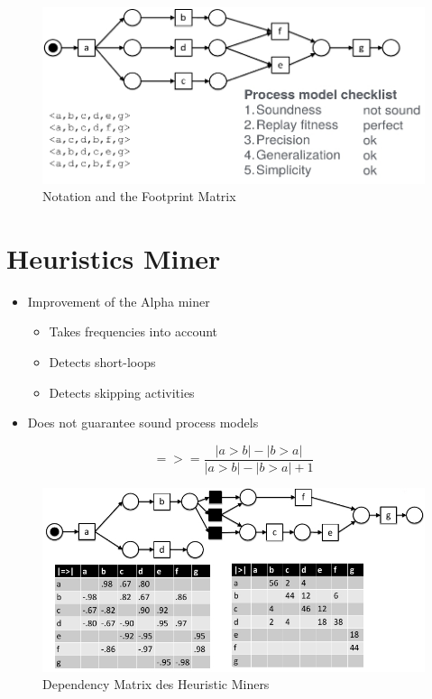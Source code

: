 \begin{figure}[H]
\includegraphics[width=14cm]{Chapters/Notizen_Graphics/Checklist_AlphaMiner.jpg}
\caption{Notation and the Footprint Matrix} 
\end{figure}

\section{Heuristics Miner}
\begin{itemize}
\item{Improvement of the Alpha miner}
	\begin{itemize}
	\item Takes frequencies into account
	\item Detects short-loops
	\item Detects skipping activities
	\end{itemize}
\item Does not guarantee sound process models
\end{itemize}

\begin{framed} \begin{equation}
=> = \frac{|a>b|-|b>a|}{|a>b|-|b>a|+1}
\end{equation} 
\end{framed}

\begin{figure}[H]
\includegraphics[width=14cm]{Chapters/Notizen_Graphics/HeuristicsMiner_Dependency_Matrix.jpg}
\caption{Dependency Matrix des Heuristic Miners} 
\end{figure}



